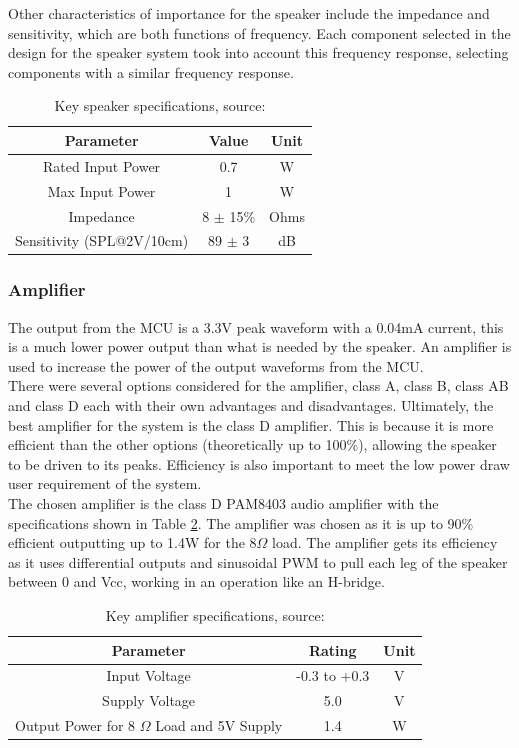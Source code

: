 \documentclass[12pt, a4paper]{article}
\begin{document}
Other characteristics of importance for the speaker include the impedance and sensitivity, which are both functions of frequency. Each component selected in the design for the speaker system took into account this frequency response, selecting components with a similar frequency response. \\

\begin{table} [!htb]
	\caption{Key speaker specifications, source: \cite{speakerDatasheet}}
	\label{tab:L_speakerSpecs}
	\centering
	\begin{tabular}{ |c|c|c| }
		\hline
		Parameter & Value & Unit \\ 
		\hline
		Rated Input Power & 0.7 & W \\ 
		Max Input Power & 1 & W \\ 
		Impedance & 8 $\pm$ 15\% & Ohms \\
		Sensitivity (SPL@2V/10cm) & 89 $\pm$ 3 & dB \\
		\hline
	\end{tabular}
\end{table}

\subsubsection{Amplifier}
The output from the MCU is a 3.3V peak waveform with a 0.04mA current, this is a much lower power output than what is needed by the speaker. An amplifier is used to increase the power of the output waveforms from the MCU. \\

There were several options considered for the amplifier, class A, class B, class AB and class D each with their own advantages and disadvantages. Ultimately, the best amplifier for the system is the class D amplifier. This is because it is more efficient than the other options (theoretically up to 100\%), allowing the speaker to be driven to its peaks. Efficiency is also important to meet the low power draw user requirement of the system. \\

The chosen amplifier is the class D PAM8403 audio amplifier with the specifications shown in Table \ref{tab:L_ampSpecs}. The amplifier was chosen as it is up to 90\% efficient outputting up to 1.4W for the 8$\Omega$ load. The amplifier gets its efficiency as it uses differential outputs and sinusoidal PWM to pull each leg of the speaker between 0 and Vcc, working in an operation like an H-bridge. \\
\begin{table} [!htb]
	\caption{Key amplifier specifications, source: \cite{amplifierDatasheet}}
	\label{tab:L_ampSpecs}
	\centering
	\begin{tabular}{ |c|c|c| } 
		\hline
		Parameter & Rating & Unit \\ 
		\hline
		Input Voltage & -0.3 to +0.3 & V \\ 
		Supply Voltage & 5.0 & V \\ 
		Output Power for 8 $\Omega$ Load and 5V Supply & 1.4 & W \\
		\hline
	\end{tabular}
\end{table}
\end{document}
